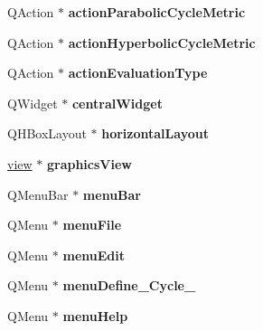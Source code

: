 \begin{DoxyCompactItemize}
Q\+Action $\ast$ {\bfseries action\+Parabolic\+Cycle\+Metric}
\item 
\mbox{\label{class_ui___main_window_a7709b35d7e47bf8e8c73401cc66b33d5}} 
Q\+Action $\ast$ {\bfseries action\+Hyperbolic\+Cycle\+Metric}
\item 
\mbox{\label{class_ui___main_window_a63ad0bb77d3a481c97a24033ef35ed36}} 
Q\+Action $\ast$ {\bfseries action\+Evaluation\+Type}
\item 
\mbox{\label{class_ui___main_window_a30075506c2116c3ed4ff25e07ae75f81}} 
Q\+Widget $\ast$ {\bfseries central\+Widget}
\item 
\mbox{\label{class_ui___main_window_acd6fdc9ebacc4b25b834162380d75ce8}} 
Q\+H\+Box\+Layout $\ast$ {\bfseries horizontal\+Layout}
\item 
\mbox{\label{class_ui___main_window_a48cc360c9d7a73abfc5ab3cee1f61e3d}} 
\mbox{\hyperlink{classview}{view}} $\ast$ {\bfseries graphics\+View}
\item 
\mbox{\label{class_ui___main_window_a2be1c24ec9adfca18e1dcc951931457f}} 
Q\+Menu\+Bar $\ast$ {\bfseries menu\+Bar}
\item 
\mbox{\label{class_ui___main_window_a7ba84cb4cdd6a12dc83bf4e100bd8d80}} 
Q\+Menu $\ast$ {\bfseries menu\+File}
\item 
\mbox{\label{class_ui___main_window_aa2a8beb7420d9a6d513949dd5661090a}} 
Q\+Menu $\ast$ {\bfseries menu\+Edit}
\item 
\mbox{\label{class_ui___main_window_a5dbb06b88129fa03318293a5e9cd8ea7}} 
Q\+Menu $\ast$ {\bfseries menu\+Define\+\_\+\+Cycle\+\_}
\item 
\mbox{\label{class_ui___main_window_ab95dbfbb0550206aeac76db36f491548}} 
Q\+Menu $\ast$ {\bfseries menu\+Help}
\item 
\mbox{\label{class_ui___main_window_a9e7f2ce6c3d8a309109baed7d6890604}} 

\end{DoxyCompactItemize}
